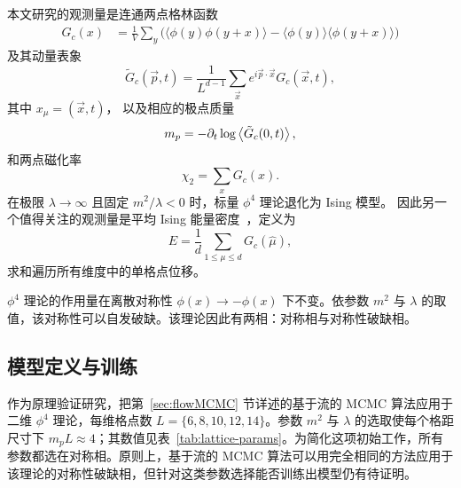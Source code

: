 本文研究的观测量是连通两点格林函数
%
\begin{equation}
\begin{aligned}
    G_c(x) &= \frac{1}{V} \sum_y \big( \langle \phi(y)\phi(y+x) \rangle - \langle \phi(y) \rangle \langle \phi(y+x) \rangle \big)
\end{aligned}
\end{equation}
%
及其动量表象
%
\begin{equation}
    \tilde{G}_c(\vec{p},t) = \frac{1}{L^{d-1}} \sum_{\vec{x}} e^{i\vec{p}\cdot\vec{x}}G_c(\vec{x},t),
\end{equation}
其中 $x_\mu = (\vec{x}, t)$，
%
以及相应的极点质量
%
\begin{equation}
    m_p = -\partial_t \log \left\langle \tilde{G}_c(0,t) \right\rangle,
\end{equation}
和两点磁化率
%
\begin{equation}
    \chi_2 = \sum_x G_c(x).
\end{equation}
%
在极限 $\lambda \rightarrow \infty$ 且固定 $m^2/\lambda < 0$ 时，标量 $\phi^4$ 理论退化为 Ising 模型。
因此另一个值得关注的观测量是平均 Ising 能量密度~\cite{vierhaus}，定义为
%
\begin{equation}
E = \frac{1}{d} \sum_{1\le \mu \le d} G_c(\hat{\mu}),
\end{equation}
%
求和遍历所有维度中的单格点位移。

$\phi^4$ 理论的作用量在离散对称性 $\phi(x) \rightarrow -\phi(x)$ 下不变。依参数 $m^2$ 与 $\lambda$ 的取值，该对称性可以自发破缺。该理论因此有两相：对称相与对称性破缺相。



\subsection{模型定义与训练}
\label{subsec:model}

作为原理验证研究，把第~\ref{sec:flowMCMC} 节详述的基于流的 MCMC 算法应用于二维 $\phi^4$ 理论，每维格点数 $L=\{6,8,10,12,14\}$。参数 $m^2$ 与 $\lambda$ 的选取使每个格距尺寸下 $m_p L \approx 4$；其数值见表~\ref{tab:lattice-params}。为简化这项初始工作，所有参数都选在对称相。原则上，基于流的 MCMC 算法可以用完全相同的方法应用于该理论的对称性破缺相，但针对这类参数选择能否训练出模型仍有待证明。

